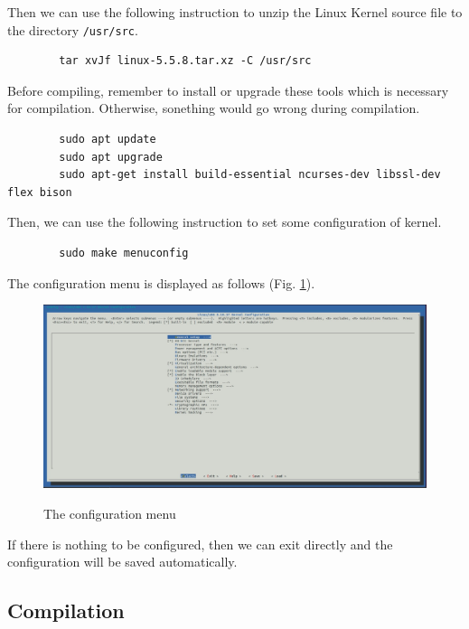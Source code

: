 \documentclass[a4paper, 12pt]{article}
\theoremstyle{definition}
\begin{document}
    Then we can use the following instruction to unzip the Linux Kernel source file to the directory \texttt{/usr/src}.

    \begin{lstlisting}
        tar xvJf linux-5.5.8.tar.xz -C /usr/src
    \end{lstlisting}
        
    Before compiling, remember to install or upgrade these tools which is necessary for compilation. Otherwise, sonething would go wrong during compilation.

    \begin{lstlisting}
        sudo apt update
        sudo apt upgrade
        sudo apt-get install build-essential ncurses-dev libssl-dev flex bison
    \end{lstlisting}

    Then, we can use the following instruction to set some configuration of kernel.

    \begin{lstlisting}
        sudo make menuconfig
    \end{lstlisting}

    The configuration menu is displayed as follows (Fig. \ref{fig3}).

    \begin{figure}[htbp]
        \centering
        \includegraphics[width=7in]{./pic/exe1/pic3.jpg}\\
        \caption{The configuration menu}\label{fig3}
    \end{figure}

    If there is nothing to be configured, then we can exit directly and the configuration will be saved automatically.

    \subsection{Compilation}
    
\end{document}
